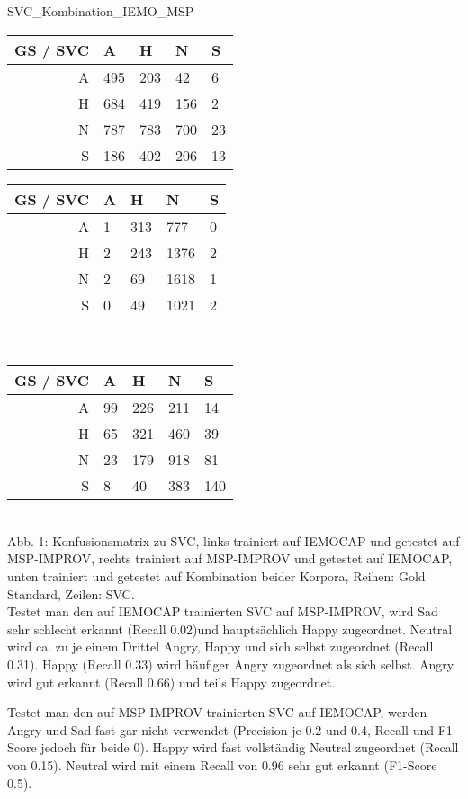 \documentclass{article} %
\begin{document}
SVC_Kombination_IEMO_MSP \\
\begin{tabular}{|r|llll|}
\hline
GS / SVC & A & H & N & S \\
\hline
A & 495 & 203 & 42 & 6 \\
H & 684 & 419 & 156 & 2 \\
N & 787 & 783 & 700 & 23 \\
S & 186 & 402 & 206 & 13 \\
\hline
\end{tabular}
\begin{tabular}{|r|llll|}
\hline
GS / SVC & A & H & N & S \\
\hline
A & 1 & 313 & 777 & 0 \\
H & 2 & 243 & 1376 & 2 \\
N & 2 & 69 & 1618 & 1 \\
S & 0 & 49 & 1021 & 2 \\
\hline
\end{tabular} \\
\begin{tabular}{|r|llll|}
\hline
GS / SVC & A & H & N & S \\
\hline
A & 99 & 226 & 211 & 14 \\
H & 65 & 321 & 460 & 39 \\
N & 23 & 179 & 918 & 81 \\
S & 8 & 40 & 383 & 140 \\
\hline
\end{tabular} \\

Abb. 1: Konfusionsmatrix zu SVC, links trainiert auf IEMOCAP und getestet auf MSP-IMPROV, rechts trainiert auf MSP-IMPROV und getestet auf IEMOCAP, unten trainiert und getestet auf Kombination beider Korpora, Reihen: Gold Standard, Zeilen: SVC. \\

Testet man den auf IEMOCAP trainierten SVC auf MSP-IMPROV, wird Sad sehr schlecht erkannt (Recall 0.02)und hauptsächlich Happy zugeordnet. Neutral wird ca. zu je einem Drittel Angry, Happy und sich selbst zugeordnet (Recall 0.31). Happy (Recall 0.33) wird häufiger Angry zugeordnet als sich selbst. Angry wird gut erkannt (Recall 0.66) und teils Happy zugeordnet. 

Testet man den auf MSP-IMPROV trainierten SVC auf IEMOCAP, werden Angry und Sad fast gar nicht verwendet (Precision je 0.2 und 0.4, Recall und F1-Score jedoch für beide 0). Happy wird fast vollständig Neutral zugeordnet (Recall von 0.15). Neutral wird mit einem Recall von 0.96 sehr gut erkannt (F1-Score 0.5). 
\end{document}
